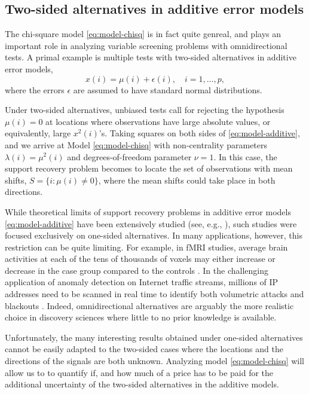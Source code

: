 \subsection{Two-sided alternatives in additive error models}
\label{subsec:motivation-additive}

The chi-square model \eqref{eq:model-chisq} is in fact quite genreal, and plays an important role in analyzing variable screening problems with omnidirectional tests.
A primal example is multiple tests with two-sided alternatives in additive error models,
\begin{equation} \label{eq:model-additive}
    x(i) = \mu(i) + \epsilon(i), \quad i=1,\ldots,p,
\end{equation}
where the errors $\epsilon$ are assumed to have standard normal distributions.

Under two-sided alternatives, unbiased tests call for rejecting the hypothesis $\mu(i)=0$ at locations where observations have large absolute values, or equivalently, large $x^2(i)$'s.
Taking squares on both sides of \eqref{eq:model-additive}, and we arrive at Model \eqref{eq:model-chisq} with non-centrality parameters $\lambda(i) = \mu^2(i)$ and degrees-of-freedom parameter $\nu =1$.
In this case, the support recovery problem becomes to locate the set of observations with mean shifts, $S=\{i:\mu(i)\neq 0\}$, where the mean shifts could take place in both directions.

While theoretical limits of support recovery problems in additive error models \eqref{eq:model-additive} have been extensively studied (see, e.g., \cite{arias2017distribution, butucea2018variable, gao2018fundamental}), such studies were focused exclusively on one-sided alternatives.
In many applications, however, this restriction can be quite limiting.
For example, in fMRI studies, average brain activities at each of the tens of thousands of voxels may either increase or decrease in the case group compared to the controls \citep{narayan2015two}. 
In the challenging application of anomaly detection on Internet traffic streams, millions of IP addresses need to be scanned in real time to identify both volumetric attacks and blackouts \citep{kallitsis2016amon}.
Indeed, omnidirectional alternatives are arguably the more realistic choice in discovery sciences where little to no prior knowledge is available.

Unfortunately, the many interesting results obtained under one-sided alternatives cannot be easily adapted to the two-sided cases where the locations and the directions of the signals are both unknown.
Analyzing model \eqref{eq:model-chisq} will allow us to to quantify if, and how much of a price has to be paid for the additional uncertainty of the two-sided alternatives in the additive models.

